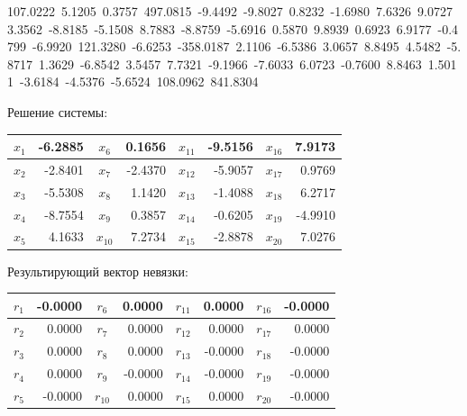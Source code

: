 \begin{MatrixBox}
{107.0222\ 5.1205\ 0.3757\ 497.0815\ -9.4492\ -9.8027\ 0.8232\ -1.6980\ 7.6326\ 9.0727\ 3.3562\ -8.8185\ -5.1508\ 8.7883\ -8.8759\ -5.6916\ 0.5870\ 9.8939\ 0.6923\ 6.9177\ -0.4799\ -6.9920\ 121.3280\ -6.6253\ -358.0187\ 2.1106\ -6.5386\ 3.0657\ 8.8495\ 4.5482\ -5.8717\ 1.3629\ -6.8542\ 3.5457\ 7.7321\ -9.1966\ -7.6033\ 6.0723\ -0.7600\ 8.8463\ 1.5011\ -3.6184\ -4.5376\ -5.6524\ 108.0962\ 841.8304%
}%
\end{MatrixBox}

Решение системы:
\begin{table}[H]
\centering
\small
\begin{tabular}{|c|r||c|r||c|r||c|r|}
\hline
$x_{1}$  & -6.2885 & $x_{6}$  & 0.1656  & $x_{11}$ & -9.5156 & $x_{16}$ & 7.9173  \\ \hline
$x_{2}$  & -2.8401 & $x_{7}$  & -2.4370 & $x_{12}$ & -5.9057 & $x_{17}$ & 0.9769  \\ \hline
$x_{3}$  & -5.5308 & $x_{8}$  & 1.1420  & $x_{13}$ & -1.4088 & $x_{18}$ & 6.2717  \\ \hline
$x_{4}$  & -8.7554 & $x_{9}$  & 0.3857  & $x_{14}$ & -0.6205 & $x_{19}$ & -4.9910 \\ \hline
$x_{5}$  & 4.1633  & $x_{10}$ & 7.2734  & $x_{15}$ & -2.8878 & $x_{20}$ & 7.0276  \\ \hline
\end{tabular}
\end{table}

Результирующий вектор невязки:
\begin{table}[H]
\centering
\small
\begin{tabular}{|c|r||c|r||c|r||c|r|}
\hline
$r_{1}$  & -0.0000 & $r_{6}$  &  0.0000 & $r_{11}$ &  0.0000 & $r_{16}$ & -0.0000 \\ \hline
$r_{2}$  &  0.0000 & $r_{7}$  &  0.0000 & $r_{12}$ &  0.0000 & $r_{17}$ &  0.0000 \\ \hline
$r_{3}$  &  0.0000 & $r_{8}$  &  0.0000 & $r_{13}$ & -0.0000 & $r_{18}$ & -0.0000 \\ \hline
$r_{4}$  &  0.0000 & $r_{9}$  & -0.0000 & $r_{14}$ & -0.0000 & $r_{19}$ & -0.0000 \\ \hline
$r_{5}$  & -0.0000 & $r_{10}$ &  0.0000 & $r_{15}$ &  0.0000 & $r_{20}$ & -0.0000 \\ \hline
\end{tabular}
\end{table}